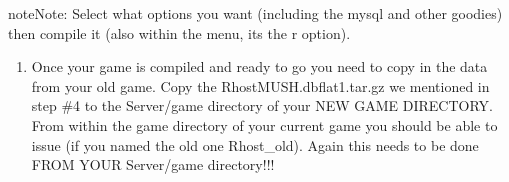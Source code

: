 \documentclass[letterpaper,10pt,english]{sphinxmanual}
\begin{document}
\begin{sphinxadmonition}{note}{Note:}
\sphinxAtStartPar
Select what options you want (including the mysql and other goodies) then compile it (also within the menu, it\textquotesingle{}s the \textquotesingle{}r\textquotesingle{} option).
\end{sphinxadmonition}
\begin{enumerate}
%
\item {} 
\sphinxAtStartPar
Once your game is compiled and ready to go you need to copy in the data from your old game.  Copy the RhostMUSH.dbflat1.tar.gz we mentioned in step \#4 to the Server/game directory of your NEW GAME DIRECTORY.  From within the \textquotesingle{}game\textquotesingle{} directory of your current game you should be able to issue (if you named the old one Rhost\_old). Again this needs to be done FROM YOUR Server/game directory!!!

\end{enumerate}
\end{document}
